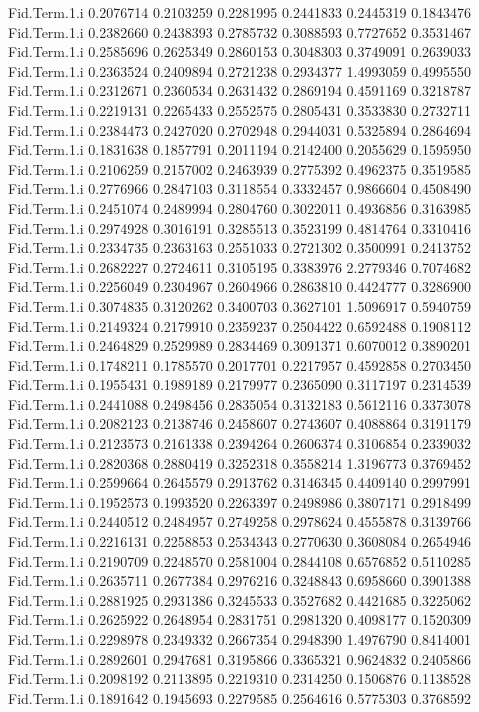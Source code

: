 \documentclass[11pt]{article} %
\begin{document}
\begin{Schunk}
\begin{Soutput}
Fid.Term.1.i 0.2076714 0.2103259 0.2281995 0.2441833 0.2445319 0.1843476
Fid.Term.1.i 0.2382660 0.2438393 0.2785732 0.3088593 0.7727652 0.3531467
Fid.Term.1.i 0.2585696 0.2625349 0.2860153 0.3048303 0.3749091 0.2639033
Fid.Term.1.i 0.2363524 0.2409894 0.2721238 0.2934377 1.4993059 0.4995550
Fid.Term.1.i 0.2312671 0.2360534 0.2631432 0.2869194 0.4591169 0.3218787
Fid.Term.1.i 0.2219131 0.2265433 0.2552575 0.2805431 0.3533830 0.2732711
Fid.Term.1.i 0.2384473 0.2427020 0.2702948 0.2944031 0.5325894 0.2864694
Fid.Term.1.i 0.1831638 0.1857791 0.2011194 0.2142400 0.2055629 0.1595950
Fid.Term.1.i 0.2106259 0.2157002 0.2463939 0.2775392 0.4962375 0.3519585
Fid.Term.1.i 0.2776966 0.2847103 0.3118554 0.3332457 0.9866604 0.4508490
Fid.Term.1.i 0.2451074 0.2489994 0.2804760 0.3022011 0.4936856 0.3163985
Fid.Term.1.i 0.2974928 0.3016191 0.3285513 0.3523199 0.4814764 0.3310416
Fid.Term.1.i 0.2334735 0.2363163 0.2551033 0.2721302 0.3500991 0.2413752
Fid.Term.1.i 0.2682227 0.2724611 0.3105195 0.3383976 2.2779346 0.7074682
Fid.Term.1.i 0.2256049 0.2304967 0.2604966 0.2863810 0.4424777 0.3286900
Fid.Term.1.i 0.3074835 0.3120262 0.3400703 0.3627101 1.5096917 0.5940759
Fid.Term.1.i 0.2149324 0.2179910 0.2359237 0.2504422 0.6592488 0.1908112
Fid.Term.1.i 0.2464829 0.2529989 0.2834469 0.3091371 0.6070012 0.3890201
Fid.Term.1.i 0.1748211 0.1785570 0.2017701 0.2217957 0.4592858 0.2703450
Fid.Term.1.i 0.1955431 0.1989189 0.2179977 0.2365090 0.3117197 0.2314539
Fid.Term.1.i 0.2441088 0.2498456 0.2835054 0.3132183 0.5612116 0.3373078
Fid.Term.1.i 0.2082123 0.2138746 0.2458607 0.2743607 0.4088864 0.3191179
Fid.Term.1.i 0.2123573 0.2161338 0.2394264 0.2606374 0.3106854 0.2339032
Fid.Term.1.i 0.2820368 0.2880419 0.3252318 0.3558214 1.3196773 0.3769452
Fid.Term.1.i 0.2599664 0.2645579 0.2913762 0.3146345 0.4409140 0.2997991
Fid.Term.1.i 0.1952573 0.1993520 0.2263397 0.2498986 0.3807171 0.2918499
Fid.Term.1.i 0.2440512 0.2484957 0.2749258 0.2978624 0.4555878 0.3139766
Fid.Term.1.i 0.2216131 0.2258853 0.2534343 0.2770630 0.3608084 0.2654946
Fid.Term.1.i 0.2190709 0.2248570 0.2581004 0.2844108 0.6576852 0.5110285
Fid.Term.1.i 0.2635711 0.2677384 0.2976216 0.3248843 0.6958660 0.3901388
Fid.Term.1.i 0.2881925 0.2931386 0.3245533 0.3527682 0.4421685 0.3225062
Fid.Term.1.i 0.2625922 0.2648954 0.2831751 0.2981320 0.4098177 0.1520309
Fid.Term.1.i 0.2298978 0.2349332 0.2667354 0.2948390 1.4976790 0.8414001
Fid.Term.1.i 0.2892601 0.2947681 0.3195866 0.3365321 0.9624832 0.2405866
Fid.Term.1.i 0.2098192 0.2113895 0.2219310 0.2314250 0.1506876 0.1138528
Fid.Term.1.i 0.1891642 0.1945693 0.2279585 0.2564616 0.5775303 0.3768592

\end{Soutput}
\end{Schunk}
\end{document}
